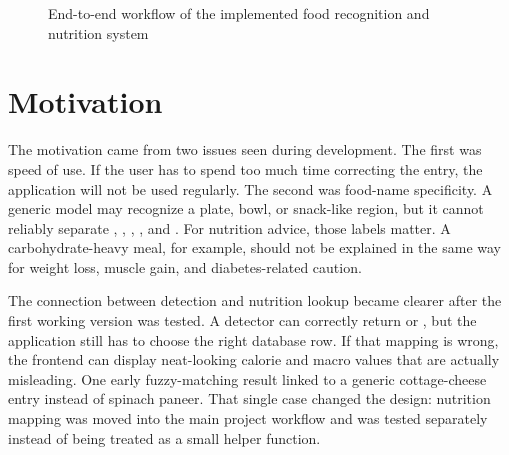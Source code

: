 \begin{figure}[H]
\centering
{}
\caption{End-to-end workflow of the implemented food recognition and nutrition system}
\label{fig:project-workflow}
\end{figure}

\section{Motivation}

The motivation came from two issues seen during development. The first was speed of use. If the user has to spend too much time correcting the entry, the application will not be used regularly. The second was food-name specificity. A generic model may recognize a plate, bowl, or snack-like region, but it cannot reliably separate , , , , and . For nutrition advice, those labels matter. A carbohydrate-heavy meal, for example, should not be explained in the same way for weight loss, muscle gain, and diabetes-related caution.

The connection between detection and nutrition lookup became clearer after the first working version was tested. A detector can correctly return  or , but the application still has to choose the right database row. If that mapping is wrong, the frontend can display neat-looking calorie and macro values that are actually misleading. One early fuzzy-matching result linked  to a generic cottage-cheese entry instead of spinach paneer. That single case changed the design: nutrition mapping was moved into the main project workflow and was tested separately instead of being treated as a small helper function.

